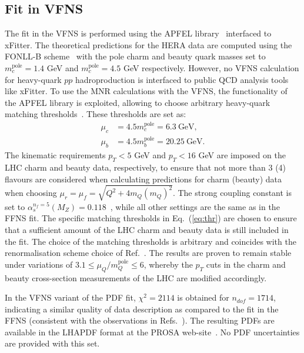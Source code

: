 \subsection{Fit in VFNS}
\label{sec:vfns}

The fit in the VFNS is performed using the APFEL library~\cite{Bertone:2013vaa} interfaced to xFitter.
The theoretical predictions for the HERA data are computed using the FONLL-B scheme~\cite{Forte:2010ta} with the pole charm and beauty quark masses set to $m_c^{\textrm{pole}} = 1.4$ GeV and $m_c^{\textrm{pole}} = 4.5$ GeV respectively.
However, no VFNS calculation for heavy-quark $pp$ hadroproduction is interfaced to public QCD analysis tools like xFitter.
To use the MNR calculations with the VFNS, the functionality of the APFEL library is exploited, allowing to choose arbitrary heavy-quark matching thresholds~\cite{Bertone:2017ehk}. These thresholds are set as:
\begin{equation}
\begin{aligned}
\mu_c &= 4.5m_c^{\textrm{pole}} = 6.3~\textrm{GeV},\\
\mu_b &= 4.5m_b^{\textrm{pole}} =  20.25~\textrm{GeV}.
\label{eq:thr}
\end{aligned}
\end{equation}
The kinematic requirements $p_T < 5$ GeV and $p_T < 16$ GeV are imposed on the LHC charm and beauty data, respectively, to ensure that not more than 3 (4) flavours are considered when calculating predictions for charm (beauty) data when choosing $\mu_r = \mu_f = \sqrt{Q^2 + 4m_Q(m_Q)^2}$.
The strong coupling constant is set to $\alpha_s^{n_f = 5}(M_Z) = 0.118$~\cite{Tanabashi:2018oca}, while all other settings are the same as in the FFNS fit.
The specific matching thresholds in Eq.~(\ref{eq:thr}) are chosen to ensure that a sufficient amount of the LHC charm and beauty data is still included in the fit.
The choice of the matching thresholds is arbitrary and coincides with the renormalisation scheme choice of Ref.~\cite{Bertone:2017ehk}. 
The results are proven to remain stable under variations of $3.1 \le \mu_Q/m_Q^{\textrm{pole}} \le 6$, whereby the $p_T$  cuts in the charm and beauty cross-section measurements of the LHC are modified accordingly. 

In the VFNS variant of the PDF fit, $\chi^2 = 2114$ is obtained for $n_{dof} = 1714$, indicating a similar quality of data description as compared to the fit in the FFNS {\color{blue}(consistent with the observations in Refs.~\cite{Abramowicz:2015mha,H1:2018flt}).} The resulting PDFs are available in the LHAPDF format at the PROSA web-site~\cite{prosaweb}. No PDF uncertainties are provided with this set.

